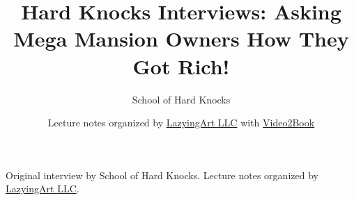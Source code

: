 \documentclass[11pt,oneside]{book}
\begin{document}
\frontmatter
\title{Hard Knocks Interviews: Asking Mega Mansion Owners How They Got Rich!}
\author{School of Hard Knocks}
\date{Lecture notes organized by \href{https://lazying.art}{LazyingArt LLC} with \href{https://github.com/lachlanchen/Video2Book}{Video2Book}}
\maketitle
\begin{center}
\small Original interview by School of Hard Knocks. Lecture notes organized by \href{https://lazying.art}{LazyingArt LLC}.
\end{center}
\clearpage
\mainmatter

\end{document}
